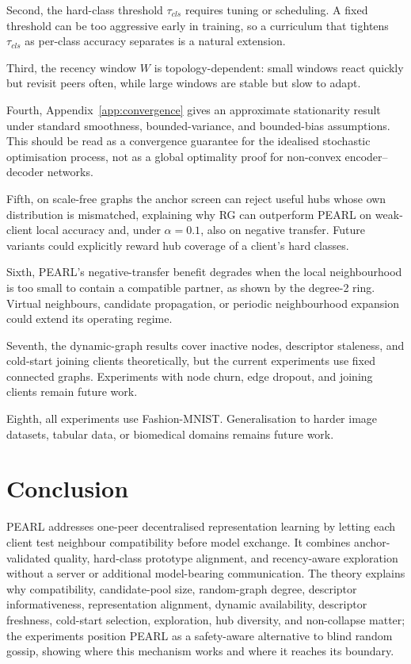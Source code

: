 \documentclass[conference]{IEEEtran}
\begin{document}
Second, the hard-class threshold \(\tau_{cls}\) requires tuning or scheduling. A fixed threshold can be too aggressive early in training, so a curriculum that tightens \(\tau_{cls}\) as per-class accuracy separates is a natural extension.

Third, the recency window \(W\) is topology-dependent: small windows react quickly but revisit peers often, while large windows are stable but slow to adapt.

Fourth, Appendix~\ref{app:convergence} gives an approximate stationarity result under standard smoothness, bounded-variance, and bounded-bias assumptions. This should be read as a convergence guarantee for the idealised stochastic optimisation process, not as a global optimality proof for non-convex encoder--decoder networks.

Fifth, on scale-free graphs the anchor screen can reject useful hubs whose own distribution is mismatched, explaining why \textsc{RG} can outperform \textsc{PEARL} on weak-client local accuracy and, under $\alpha=0.1$, also on negative transfer. Future variants could explicitly reward hub coverage of a client's hard classes.

Sixth, PEARL's negative-transfer benefit degrades when the local neighbourhood is too small to contain a compatible partner, as shown by the degree-2 ring. Virtual neighbours, candidate propagation, or periodic neighbourhood expansion could extend its operating regime.

Seventh, the dynamic-graph results cover inactive nodes, descriptor staleness, and cold-start joining clients theoretically, but the current experiments use fixed connected graphs. Experiments with node churn, edge dropout, and joining clients remain future work.

Eighth, all experiments use Fashion-MNIST. Generalisation to harder image datasets, tabular data, or biomedical domains remains future work.


\section{Conclusion}
\label{sec:conclusion}

PEARL addresses one-peer decentralised representation learning by letting each client test neighbour compatibility before model exchange. It combines anchor-validated quality, hard-class prototype alignment, and recency-aware exploration without a server or additional model-bearing communication. The theory explains why compatibility, candidate-pool size, random-graph degree, descriptor informativeness, representation alignment, dynamic availability, descriptor freshness, cold-start selection, exploration, hub diversity, and non-collapse matter; the experiments position PEARL as a safety-aware alternative to blind random gossip, showing where this mechanism works and where it reaches its boundary.
\end{document}
